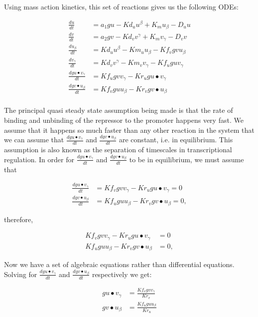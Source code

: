 \noindent Using mass action kinetics, this set of reactions gives us the following ODEs:

\begin{align}\label{eq:gard_ma_ode}
	\frac{du}{dt} &= a_{1}gu - Kd_{u}u^β + K_{m}u_β - D_u u\\
	\frac{dv}{dt} &= a_{2}gv - Kd_{v}v^γ + K_{m}v_γ - D_v v\\
	\frac{du_β}{dt} &= Kd_{u}u^β - Km_{u}u_β - Kf_{v}gv u_β\\
	\frac{dv_γ}{dt} &= Kd_{v}v^γ - Km_{v}v_γ - Kf_{u}gu v_γ\\
	\frac{dgu\bullet v_γ}{dt} &= Kf_{u}gv v_{γ} - Kr_{u}gu\bullet v_γ\\
	\frac{dgv\bullet u_β}{dt} &= Kf_{v}gu u_{β} - Kr_{v}gv\bullet u_β\\	
\end{align}


The principal quasi steady state assumption being made is that the rate of binding and unbinding of the repressor to the promoter happens very fast. We assume that it happens so much faster than any other reaction in the system that we can assume that $\frac{dgu\bullet v_γ}{dt}$ and $\frac{dgv\bullet u_β}{dt}$ are constant, i.e. in equilibrium. This assumption is also known as the separation of timescales in transcriptional regulation. In order for $\frac{dgu\bullet v_γ}{dt}$ and $\frac{dgv\bullet u_β}{dt}$ to be in equilibrium, we must assume that

\begin{align}
	\frac{dgu\bullet v_γ}{dt} &= Kf_{v}gv v_{γ} - Kr_{u}gu\bullet v_γ = 0\\
	\frac{dgv\bullet u_β}{dt} &= Kf_{u}gu u_{β} - Kr_{v}gv\bullet u_β = 0,
\end{align}

\noindent therefore,

\begin{align}
	Kf_{v}gv v_{γ} - Kr_{u}gu\bullet  v_γ &= 0\\
	Kf_{u}gu u_{β} - Kr_{v}gv\bullet  u_β &= 0,
\end{align}

\noindent Now we have a set of algebraic equations rather than differential equations. Solving for $\frac{dgu\bullet v_γ}{dt}$ and $\frac{dgv\bullet u_β}{dt}$  respectively we get:

\begin{align}
	gu\bullet  v_γ &= \frac{Kf_{v}gv v_{γ}}{Kr_{v}} \\
	gv\bullet  u_β &= \frac{Kf_{u}gu u_{β}}{Kr_{u}} 
\end{align}

